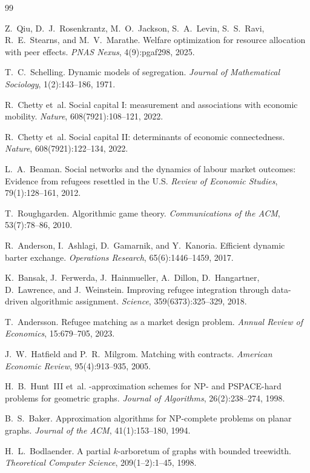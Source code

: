 \documentclass[11pt]{article}
\begin{document}

\begin{thebibliography}{99}

Z.~Qiu, D.~J.~Rosenkrantz, M.~O.~Jackson, S.~A.~Levin, S.~S.~Ravi, R.~E.~Stearns,
and M.~V.~Marathe.
\newblock Welfare optimization for resource allocation with peer effects.
\newblock \textit{PNAS Nexus}, 4(9):pgaf298, 2025.

T.~C.~Schelling.
\newblock Dynamic models of segregation.
\newblock \textit{Journal of Mathematical Sociology}, 1(2):143--186, 1971.

R.~Chetty et~al.
\newblock Social capital {I}: measurement and associations with economic mobility.
\newblock \textit{Nature}, 608(7921):108--121, 2022.

R.~Chetty et~al.
\newblock Social capital {II}: determinants of economic connectedness.
\newblock \textit{Nature}, 608(7921):122--134, 2022.

L.~A.~Beaman.
\newblock Social networks and the dynamics of labour market outcomes: Evidence from
refugees resettled in the {U.S.}
\newblock \textit{Review of Economic Studies}, 79(1):128--161, 2012.

T.~Roughgarden.
\newblock Algorithmic game theory.
\newblock \textit{Communications of the ACM}, 53(7):78--86, 2010.

R.~Anderson, I.~Ashlagi, D.~Gamarnik, and Y.~Kanoria.
\newblock Efficient dynamic barter exchange.
\newblock \textit{Operations Research}, 65(6):1446--1459, 2017.

K.~Bansak, J.~Ferwerda, J.~Hainmueller, A.~Dillon, D.~Hangartner, D.~Lawrence,
and J.~Weinstein.
\newblock Improving refugee integration through data-driven algorithmic assignment.
\newblock \textit{Science}, 359(6373):325--329, 2018.

T.~Andersson.
\newblock Refugee matching as a market design problem.
\newblock \textit{Annual Review of Economics}, 15:679--705, 2023.

J.~W.~Hatfield and P.~R.~Milgrom.
\newblock Matching with contracts.
\newblock \textit{American Economic Review}, 95(4):913--935, 2005.

H.~B.~Hunt~III et~al.
-approximation schemes for {NP}- and {PSPACE}-hard problems for
geometric graphs.
\newblock \textit{Journal of Algorithms}, 26(2):238--274, 1998.

B.~S.~Baker.
\newblock Approximation algorithms for {NP}-complete problems on planar graphs.
\newblock \textit{Journal of the ACM}, 41(1):153--180, 1994.

H.~L.~Bodlaender.
\newblock A partial $k$-arboretum of graphs with bounded treewidth.
\newblock \textit{Theoretical Computer Science}, 209(1--2):1--45, 1998.

\end{thebibliography}
\end{document}
